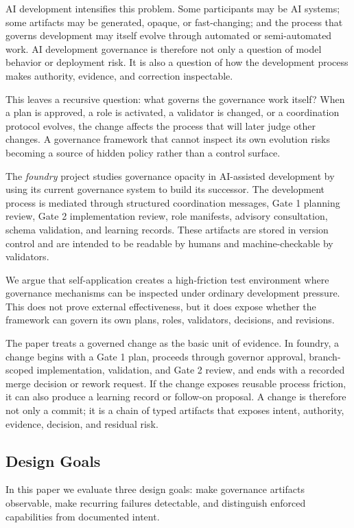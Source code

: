 \documentclass[conference]{IEEEtran}
\begin{document}
AI development intensifies this problem. Some participants may be AI systems; some artifacts may be generated, opaque, or fast-changing; and the process that governs development may itself evolve through automated or semi-automated work. AI development governance is therefore not only a question of model behavior or deployment risk. It is also a question of how the development process makes authority, evidence, and correction inspectable.

This leaves a recursive question: what governs the governance work itself? When a plan is approved, a role is activated, a validator is changed, or a coordination protocol evolves, the change affects the process that will later judge other changes. A governance framework that cannot inspect its own evolution risks becoming a source of hidden policy rather than a control surface.

The \emph{foundry} project studies governance opacity in AI-assisted development by using its current governance system to build its successor. The development process is mediated through structured coordination messages, Gate 1 planning review, Gate 2 implementation review, role manifests, advisory consultation, schema validation, and learning records. These artifacts are stored in version control and are intended to be readable by humans and machine-checkable by validators.

We argue that self-application creates a high-friction test environment where governance mechanisms can be inspected under ordinary development pressure. This does not prove external effectiveness, but it does expose whether the framework can govern its own plans, roles, validators, decisions, and revisions.

The paper treats a governed change as the basic unit of evidence. In foundry, a change begins with a Gate 1 plan, proceeds through governor approval, branch-scoped implementation, validation, and Gate 2 review, and ends with a recorded merge decision or rework request. If the change exposes reusable process friction, it can also produce a learning record or follow-on proposal. A change is therefore not only a commit; it is a chain of typed artifacts that exposes intent, authority, evidence, decision, and residual risk.

\subsection{Design Goals}

In this paper we evaluate three design goals: make governance artifacts observable, make recurring failures detectable, and distinguish enforced capabilities from documented intent.
\end{document}

